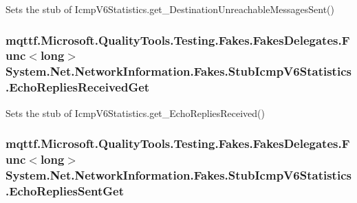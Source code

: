 Sets the stub of Icmp\-V6\-Statistics.\-get\-\_\-\-Destination\-Unreachable\-Messages\-Sent()

\hypertarget{class_system_1_1_net_1_1_network_information_1_1_fakes_1_1_stub_icmp_v6_statistics_a7ccec7bb9a7ec9d985751b2a42db2829}{
\subsubsection[{Echo\-Replies\-Received\-Get}]{\setlength{\rightskip}{0pt plus 5cm}mqttf.\-Microsoft.\-Quality\-Tools.\-Testing.\-Fakes.\-Fakes\-Delegates.\-Func$<$long$>$ System.\-Net.\-Network\-Information.\-Fakes.\-Stub\-Icmp\-V6\-Statistics.\-Echo\-Replies\-Received\-Get}}\label{class_system_1_1_net_1_1_network_information_1_1_fakes_1_1_stub_icmp_v6_statistics_a7ccec7bb9a7ec9d985751b2a42db2829}


Sets the stub of Icmp\-V6\-Statistics.\-get\-\_\-\-Echo\-Replies\-Received()

\hypertarget{class_system_1_1_net_1_1_network_information_1_1_fakes_1_1_stub_icmp_v6_statistics_a5dc21643fcd3eaea7e1bbe4c50c5fd01}{
\subsubsection[{Echo\-Replies\-Sent\-Get}]{\setlength{\rightskip}{0pt plus 5cm}mqttf.\-Microsoft.\-Quality\-Tools.\-Testing.\-Fakes.\-Fakes\-Delegates.\-Func$<$long$>$ System.\-Net.\-Network\-Information.\-Fakes.\-Stub\-Icmp\-V6\-Statistics.\-Echo\-Replies\-Sent\-Get}}\label{class_system_1_1_net_1_1_network_information_1_1_fakes_1_1_stub_icmp_v6_statistics_a5dc21643fcd3eaea7e1bbe4c50c5fd01}


